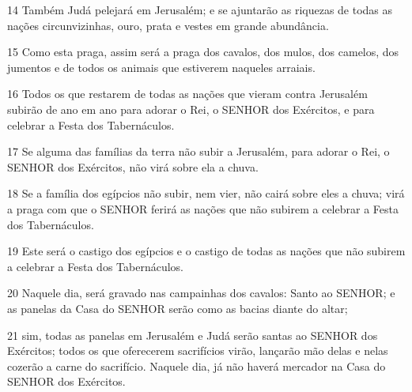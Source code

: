 \par 14 Também Judá pelejará em Jerusalém; e se ajuntarão as riquezas de todas as nações circunvizinhas, ouro, prata e vestes em grande abundância.
\par 15 Como esta praga, assim será a praga dos cavalos, dos mulos, dos camelos, dos jumentos e de todos os animais que estiverem naqueles arraiais.
\par 16 Todos os que restarem de todas as nações que vieram contra Jerusalém subirão de ano em ano para adorar o Rei, o SENHOR dos Exércitos, e para celebrar a Festa dos Tabernáculos.
\par 17 Se alguma das famílias da terra não subir a Jerusalém, para adorar o Rei, o SENHOR dos Exércitos, não virá sobre ela a chuva.
\par 18 Se a família dos egípcios não subir, nem vier, não cairá sobre eles a chuva; virá a praga com que o SENHOR ferirá as nações que não subirem a celebrar a Festa dos Tabernáculos.
\par 19 Este será o castigo dos egípcios e o castigo de todas as nações que não subirem a celebrar a Festa dos Tabernáculos.
\par 20 Naquele dia, será gravado nas campainhas dos cavalos: Santo ao SENHOR; e as panelas da Casa do SENHOR serão como as bacias diante do altar;
\par 21 sim, todas as panelas em Jerusalém e Judá serão santas ao SENHOR dos Exércitos; todos os que oferecerem sacrifícios virão, lançarão mão delas e nelas cozerão a carne do sacrifício. Naquele dia, já não haverá mercador na Casa do SENHOR dos Exércitos.


